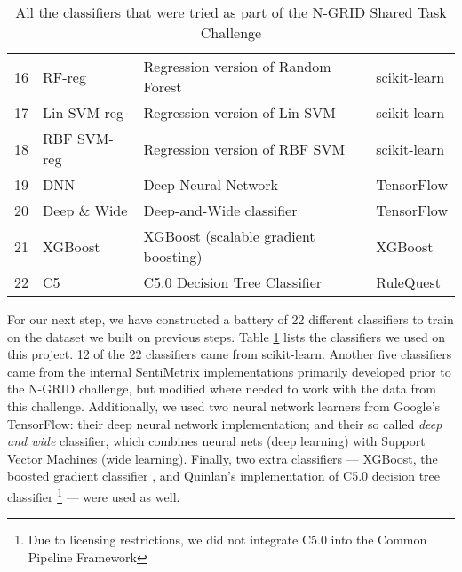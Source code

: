 \begin{table}[t]
{\begin{tabular}{|l|l|l|l|}
    16 & \textsf{RF-reg} & \textsf{Regression version of Random Forest \cite{ho95}}& \textsf{scikit-learn}\\
    17 & \textsf{Lin-SVM-reg} & \textsf{Regression version of Lin-SVM \cite{cortes95}}& \textsf{scikit-learn}\\
    18 & \textsf{RBF SVM-reg} & \textsf{Regression version of RBF SVM \cite{cortes95}}& \textsf{scikit-learn}\\
    \hline
    19 & \textsf{DNN} & \textsf{Deep Neural Network \cite{tensorflow}}& \textsf{TensorFlow} \\
    20 & \textsf{Deep \& Wide} & \textsf{Deep-and-Wide classifier \cite{tensorflow}}& \textsf{TensorFlow} \\
    \hline
    21 & \textsf{XGBoost}& \textsf{XGBoost (scalable gradient boosting) \cite{xgboost}}& \textsf{XGBoost} \\
    22 & \textsf{C5} & \textsf{C5.0 Decision Tree Classifier \cite{c5}} & \textsf{RuleQuest} \\
    \hline
    \end{tabular}
    \caption{All the classifiers that were tried as part of the N-GRID Shared Task Challenge}
    \label{tab:Classifiers}
}
\end{table}


For our next step, we have constructed a battery of 22 different classifiers
to train on the dataset we built on previous steps. 
Table \ref{tab:Classifiers} lists the classifiers we
used on this project. 12 of the 22 classifiers came from \textsf{scikit-learn}.
Another five classifiers came from the internal SentiMetrix implementations
primarily developed prior to the N-GRID challenge, but modified where needed
to work with the data from this challenge.  Additionally, we used two 
neural network learners from Google's \textsf{TensorFlow}: their deep neural network
implementation; and their so called \textit{deep and wide} classifier, which
combines neural nets (deep learning) with Support Vector Machines (wide learning).
Finally, two extra classifiers --- \textsf{XGBoost}, the boosted gradient classifier
\cite{xgboost}, and Quinlan's implementation of
C5.0 decision tree classifier \footnote{Due to licensing restrictions, we did not integrate C5.0 into the Common Pipeline Framework} \cite{c5} --- were used as well.

